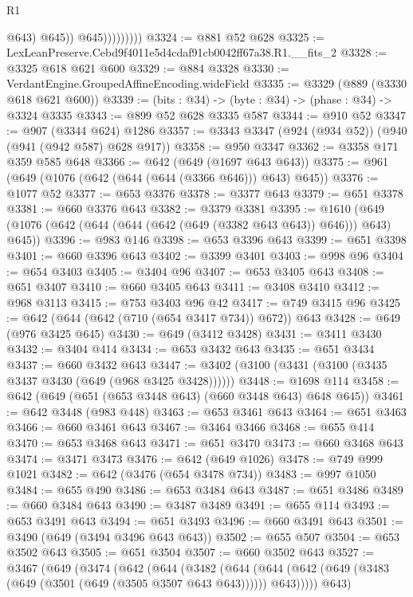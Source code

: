 \begin{lexlean}{R1}
\begin{coremodule}
                            @643)
                          @645))
                      @645)))))))))
@3324 := @881 @52 @628
@3325 := LexLeanPreserve.Cebd9f4011e5d4cdaf91cb0042ff67a38.R1.__fits_2
@3328 := @3325 @618 @621 @600
@3329 := @884 @3328
@3330 := VerdantEngine.GroupedAffineEncoding.wideField
@3335 := @3329 (@889 (@3330 @618 @621 @600))
@3339 := (bits : @34) -> (byte : @34) -> (phase : @34) -> @3324 @3335
@3343 := @899 @52 @628 @3335 @587
@3344 := @910 @52
@3347 := @907 (@3344 @624) @1286
@3357 := @3343 @3347 (@924 (@934 @52)) (@940 (@941 (@942 @587) @628 @917))
@3358 := @950 @3347
@3362 := @3358 @171 @359 @585 @648
@3366 := @642 (@649 (@1697 @643 @643))
@3375 := @961 (@649 (@1076 (@642 (@644 (@644 (@3366 @646))) @643) @645))
@3376 := @1077 @52
@3377 := @653 @3376
@3378 := @3377 @643
@3379 := @651 @3378
@3381 := @660 @3376 @643
@3382 := @3379 @3381
@3395 := @1610 (@649 (@1076 (@642 (@644 (@644 (@642 (@649 (@3382 @643 @643)) @646))) @643) @645))
@3396 := @983 @146
@3398 := @653 @3396 @643
@3399 := @651 @3398
@3401 := @660 @3396 @643
@3402 := @3399 @3401
@3403 := @998 @96
@3404 := @654 @3403
@3405 := @3404 @96
@3407 := @653 @3405 @643
@3408 := @651 @3407
@3410 := @660 @3405 @643
@3411 := @3408 @3410
@3412 := @968 @3113
@3415 := @753 @3403 @96 @42
@3417 := @749 @3415 @96
@3425 := @642 (@644 (@642 (@710 (@654 @3417 @734)) @672)) @643
@3428 := @649 (@976 @3425 @645)
@3430 := @649 (@3412 @3428)
@3431 := @3411 @3430
@3432 := @3404 @414
@3434 := @653 @3432 @643
@3435 := @651 @3434
@3437 := @660 @3432 @643
@3447 := @3402 (@3100 (@3431 (@3100 (@3435 @3437 @3430 (@649 (@968 @3425 @3428))))))
@3448 := @1698 @114
@3458 := @642 (@649 (@651 (@653 @3448 @643) (@660 @3448 @643) @648 @645))
@3461 := @642 @3448 (@983 @448)
@3463 := @653 @3461 @643
@3464 := @651 @3463
@3466 := @660 @3461 @643
@3467 := @3464 @3466
@3468 := @655 @414
@3470 := @653 @3468 @643
@3471 := @651 @3470
@3473 := @660 @3468 @643
@3474 := @3471 @3473
@3476 := @642 (@649 @1026)
@3478 := @749 @999 @1021
@3482 := @642 (@3476 (@654 @3478 @734))
@3483 := @997 @1050
@3484 := @655 @490
@3486 := @653 @3484 @643
@3487 := @651 @3486
@3489 := @660 @3484 @643
@3490 := @3487 @3489
@3491 := @655 @114
@3493 := @653 @3491 @643
@3494 := @651 @3493
@3496 := @660 @3491 @643
@3501 := @3490 (@649 (@3494 @3496 @643 @643))
@3502 := @655 @507
@3504 := @653 @3502 @643
@3505 := @651 @3504
@3507 := @660 @3502 @643
@3527 := @3467
    (@649
      (@3474
        (@642
          (@644
            (@3482
              (@644
                (@644 (@642 (@649 (@3483 (@649 (@3501 (@649 (@3505 @3507 @643 @643)))))) @643)))))
          @643)

\end{coremodule}
\end{lexlean}
